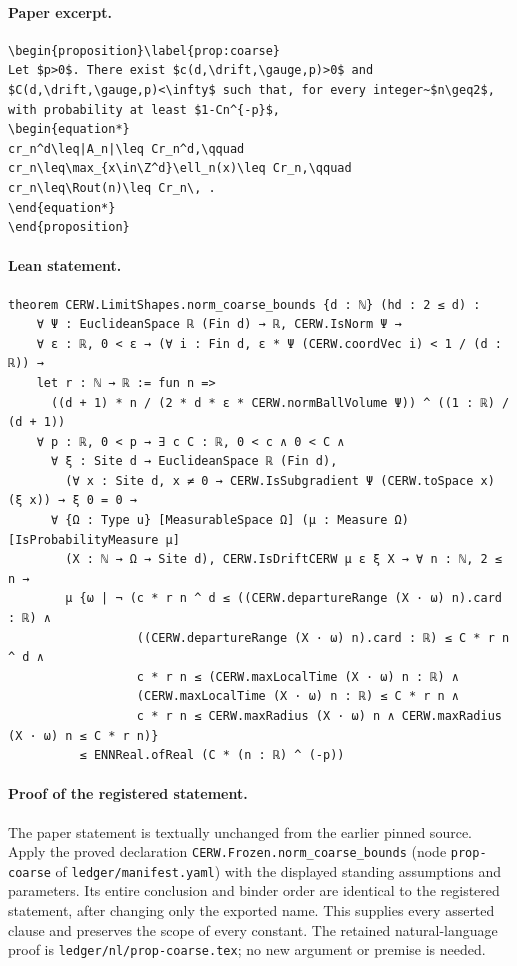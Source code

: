 \paragraph{Paper excerpt.}
\begin{verbatim}
\begin{proposition}\label{prop:coarse}
Let $p>0$. There exist $c(d,\drift,\gauge,p)>0$ and $C(d,\drift,\gauge,p)<\infty$ such that, for every integer~$n\geq2$, with probability at least $1-Cn^{-p}$,
\begin{equation*}
cr_n^d\leq|A_n|\leq Cr_n^d,\qquad
cr_n\leq\max_{x\in\Z^d}\ell_n(x)\leq Cr_n,\qquad
cr_n\leq\Rout(n)\leq Cr_n\, .
\end{equation*}
\end{proposition}
\end{verbatim}
\paragraph{Lean statement.}
\begin{verbatim}
theorem CERW.LimitShapes.norm_coarse_bounds {d : ℕ} (hd : 2 ≤ d) :
    ∀ Ψ : EuclideanSpace ℝ (Fin d) → ℝ, CERW.IsNorm Ψ →
    ∀ ε : ℝ, 0 < ε → (∀ i : Fin d, ε * Ψ (CERW.coordVec i) < 1 / (d : ℝ)) →
    let r : ℕ → ℝ := fun n =>
      ((d + 1) * n / (2 * d * ε * CERW.normBallVolume Ψ)) ^ ((1 : ℝ) / (d + 1))
    ∀ p : ℝ, 0 < p → ∃ c C : ℝ, 0 < c ∧ 0 < C ∧
      ∀ ξ : Site d → EuclideanSpace ℝ (Fin d),
        (∀ x : Site d, x ≠ 0 → CERW.IsSubgradient Ψ (CERW.toSpace x) (ξ x)) → ξ 0 = 0 →
      ∀ {Ω : Type u} [MeasurableSpace Ω] (μ : Measure Ω) [IsProbabilityMeasure μ]
        (X : ℕ → Ω → Site d), CERW.IsDriftCERW μ ε ξ X → ∀ n : ℕ, 2 ≤ n →
        μ {ω | ¬ (c * r n ^ d ≤ ((CERW.departureRange (X · ω) n).card : ℝ) ∧
                  ((CERW.departureRange (X · ω) n).card : ℝ) ≤ C * r n ^ d ∧
                  c * r n ≤ (CERW.maxLocalTime (X · ω) n : ℝ) ∧
                  (CERW.maxLocalTime (X · ω) n : ℝ) ≤ C * r n ∧
                  c * r n ≤ CERW.maxRadius (X · ω) n ∧ CERW.maxRadius (X · ω) n ≤ C * r n)}
          ≤ ENNReal.ofReal (C * (n : ℝ) ^ (-p))
\end{verbatim}
\paragraph{Proof of the registered statement.}
The paper statement is textually unchanged from the earlier pinned source.
Apply the proved declaration \texttt{CERW.Frozen.norm\_coarse\_bounds}
(node \texttt{prop-coarse} of \texttt{ledger/manifest.yaml}) with the displayed
standing assumptions and parameters. Its entire conclusion and binder order
are identical to the registered statement, after changing only the exported
name. This supplies every asserted clause and preserves the scope of every
constant. The retained natural-language proof is
\texttt{ledger/nl/prop-coarse.tex}; no new argument or premise is needed.
